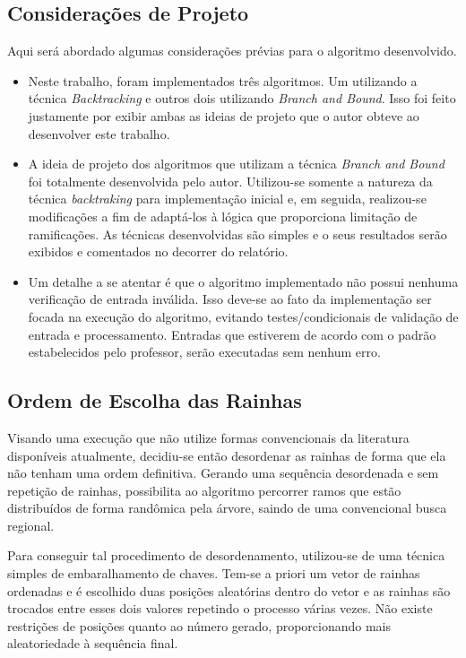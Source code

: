\documentclass[12pt]{article}
\begin{document}
	\subsection{Considerações de Projeto}
		Aqui será abordado algumas considerações prévias para o algoritmo desenvolvido.

		\begin{itemize}
			\item Neste trabalho, foram implementados três algoritmos. Um utilizando a técnica \textit{Backtracking} e outros dois utilizando \textit{Branch and Bound}. Isso foi feito justamente por exibir ambas as ideias de projeto que o autor obteve ao desenvolver este trabalho.

			\item A ideia de projeto dos algoritmos que utilizam a técnica \textit{Branch and Bound} foi totalmente desenvolvida pelo autor. Utilizou-se somente a natureza da técnica \textit{backtraking} para implementação inicial e, em seguida, realizou-se modificações a fim de adaptá-los à lógica que proporciona limitação de ramificações. As técnicas desenvolvidas são simples e o seus resultados serão exibidos e comentados no decorrer do relatório.

			\item Um detalhe a se atentar é que o algoritmo implementado não possui nenhuma verificação de entrada inválida. Isso deve-se ao fato da implementação ser focada na execução do algoritmo, evitando testes/condicionais de validação de entrada e processamento. Entradas que estiverem de acordo com o padrão estabelecidos pelo professor, serão executadas sem nenhum erro.
		\end{itemize}

	\subsection{Ordem de Escolha das Rainhas} \label{sec:rainhasDesordenadas}
		Visando uma execução que não utilize formas convencionais da literatura disponíveis atualmente, decidiu-se então desordenar as rainhas de forma que ela não tenham uma ordem definitiva. Gerando uma sequência desordenada e sem repetição de rainhas, possibilita ao algoritmo percorrer ramos que estão distribuídos de forma randômica pela árvore, saindo de uma convencional busca regional.

		Para conseguir tal procedimento de desordenamento, utilizou-se de uma técnica simples de embaralhamento de chaves. Tem-se a priori um vetor de rainhas ordenadas e é escolhido duas posições aleatórias dentro do vetor e as rainhas são trocados entre esses dois valores repetindo o processo várias vezes. Não existe restrições de posições quanto ao número gerado, proporcionando mais aleatoriedade à sequência final.
\end{document}
